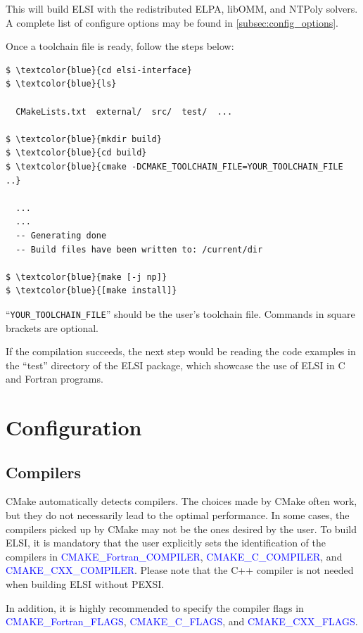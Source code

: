 \documentclass{report}
\begin{document}
This will build ELSI with the redistributed ELPA, libOMM, and NTPoly solvers. A complete list of configure options may be found in \ref{subsec:config_options}.

Once a toolchain file is ready, follow the steps below:
\begin{tcolorbox}
\begin{Verbatim}[commandchars=\\\{\}]
$ \textcolor{blue}{cd elsi-interface}
$ \textcolor{blue}{ls}

  CMakeLists.txt  external/  src/  test/  ...

$ \textcolor{blue}{mkdir build}
$ \textcolor{blue}{cd build}
$ \textcolor{blue}{cmake -DCMAKE_TOOLCHAIN_FILE=YOUR_TOOLCHAIN_FILE ..}

  ...
  ...
  -- Generating done
  -- Build files have been written to: /current/dir

$ \textcolor{blue}{make [-j np]}
$ \textcolor{blue}{[make install]}
\end{Verbatim}
\end{tcolorbox}

``\verb+YOUR_TOOLCHAIN_FILE+'' should be the user's toolchain file. Commands in square brackets are optional.

If the compilation succeeds, the next step would be reading the code examples in the ``test'' directory of the ELSI package, which showcase the use of ELSI in C and Fortran programs.

\section{Configuration}
\label{sec:config}
\subsection{Compilers}
\label{subsec:config_compilers}
CMake automatically detects compilers. The choices made by CMake often work, but they do not necessarily lead to the optimal performance. In some cases, the compilers picked up by CMake may not be the ones desired by the user. To build ELSI, it is mandatory that the user explicitly sets the identification of the compilers in \textcolor{blue}{CMAKE\_Fortran\_COMPILER}, \textcolor{blue}{CMAKE\_C\_COMPILER}, and \textcolor{blue}{CMAKE\_CXX\_COMPILER}. Please note that the C++ compiler is not needed when building ELSI without PEXSI.

In addition, it is highly recommended to specify the compiler flags in \textcolor{blue}{CMAKE\_Fortran\_FLAGS}, \textcolor{blue}{CMAKE\_C\_FLAGS}, and \textcolor{blue}{CMAKE\_CXX\_FLAGS}.
\end{document}
